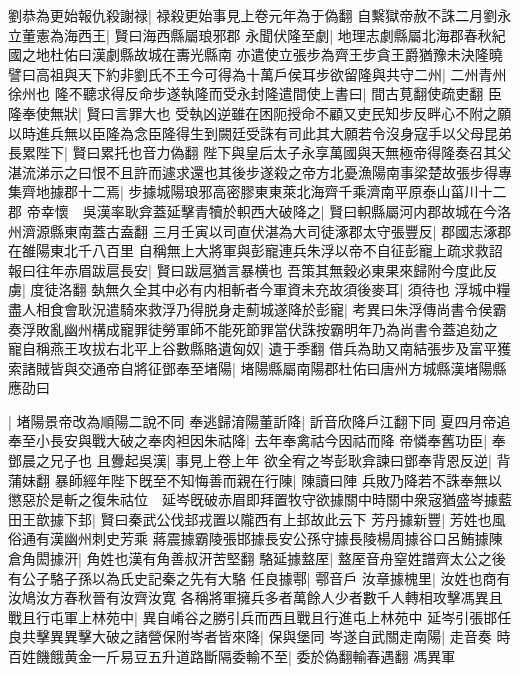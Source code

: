 劉恭為更始報仇殺謝禄|{
	禄殺更始事見上卷元年為于偽翻}
自繫獄帝赦不誅二月劉永立董憲為海西王|{
	賢曰海西縣屬琅邪郡}
永聞伏隆至劇|{
	地理志劇縣屬北海郡春秋紀國之地杜佑曰漢劇縣故城在夀光縣南}
亦遣使立張步為齊王步貪王爵猶豫未決隆曉譬曰高祖與天下約非劉氏不王今可得為十萬戶侯耳步欲留隆與共守二州|{
	二州青州徐州也}
隆不聽求得反命步遂執隆而受永封隆遣間使上書曰|{
	間古莧翻使疏吏翻}
臣隆奉使無狀|{
	賢曰言罪大也}
受執凶逆雖在困阨授命不顧又吏民知步反畔心不附之願以時進兵無以臣隆為念臣隆得生到闕廷受誅有司此其大願若令沒身寇手以父母昆弟長累陛下|{
	賢曰累托也音力偽翻}
陛下與皇后太子永享萬國與天無極帝得隆奏召其父湛流涕示之曰恨不且許而遽求還也其後步遂殺之帝方北憂漁陽南事梁楚故張步得專集齊地據郡十二焉|{
	步據城陽琅邪高密膠東東萊北海齊千乘濟南平原泰山菑川十二郡}
帝幸懷　吳漢率耿弇蓋延擊青犢於軹西大破降之|{
	賢曰軹縣屬河内郡故城在今洛州濟源縣東南蓋古盍翻}
三月壬寅以司直伏湛為大司徒涿郡太守張豐反|{
	郡國志涿郡在雒陽東北千八百里}
自稱無上大將軍與彭寵連兵朱浮以帝不自征彭寵上疏求救詔報曰往年赤眉跋扈長安|{
	賢曰跋扈猶言暴横也}
吾策其無穀必東果來歸附今度此反虜|{
	度徒洛翻}
埶無久全其中必有内相斬者今軍資未充故須後麥耳|{
	須待也}
浮城中糧盡人相食會耿況遣騎來救浮乃得脱身走薊城遂降於彭寵|{
	考異曰朱浮傳尚書令侯霸奏浮敗亂幽州構成寵罪徒勞軍師不能死節罪當伏誅按霸明年乃為尚書令蓋追劾之}
寵自稱燕王攻拔右北平上谷數縣賂遺匈奴|{
	遺于季翻}
借兵為助又南結張步及富平獲索諸賊皆與交通帝自將征鄧奉至堵陽|{
	堵陽縣屬南陽郡杜佑曰唐州方城縣漢堵陽縣應劭曰}


|{
	堵陽景帝改為順陽二說不同}
奉逃歸淯陽董訢降|{
	訢音欣降戶江翻下同}
夏四月帝追奉至小長安與戰大破之奉肉袒因朱祜降|{
	去年奉禽祜今因祜而降}
帝憐奉舊功臣|{
	奉鄧晨之兄子也}
且釁起吳漢|{
	事見上卷上年}
欲全宥之岑彭耿弇諫曰鄧奉背恩反逆|{
	背蒲妹翻}
暴師經年陛下旣至不知悔善而親在行陳|{
	陳讀曰陣}
兵敗乃降若不誅奉無以懲惡於是斬之復朱祜位　延岑旣破赤眉即拜置牧守欲據關中時關中衆宼猶盛岑據藍田王歆據下邽|{
	賢曰秦武公伐邽戎置以隴西有上邽故此云下}
芳丹據新豐|{
	芳姓也風俗通有漢幽州刺史芳乘}
蔣震據霸陵張邯據長安公孫守據長陵楊周據谷口呂鮪據陳倉角閎據汧|{
	角姓也漢有角善叔汧苦堅翻}
駱延據盩厔|{
	盩厔音舟窒姓譜齊太公之後有公子駱子孫以為氏史記秦之先有大駱}
任良據鄠|{
	鄠音戶}
汝章據槐里|{
	汝姓也商有汝鳩汝方春秋晉有汝齊汝寛}
各稱將軍擁兵多者萬餘人少者數千人轉相攻擊馮異且戰且行屯軍上林苑中|{
	異自崤谷之勝引兵而西且戰且行進屯上林苑中}
延岑引張邯任良共擊異異擊大破之諸營保附岑者皆來降|{
	保與堡同}
岑遂自武關走南陽|{
	走音奏}
時百姓饑餓黄金一斤易豆五升道路斷隔委輸不至|{
	委於偽翻輸春遇翻}
馮異軍

